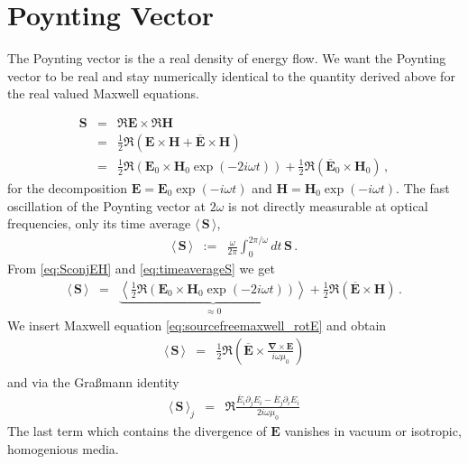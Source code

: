 \documentclass[12pt,a4paper,twoside,openright,BCOR10mm,headsepline,titlepage,abstracton,chapterprefix,final]{scrreprt}
\newcommand\Vector[1]{{\mathbf{#1}}}
\newcommand\vacuum{0}
\newcommand\Nabla{\Vector{\nabla}}
\newcommand\scalarEfield{E}
\newcommand\scalarHfield{H}
\newcommand\Efield{\Vector{\scalarEfield}}
\newcommand\Hfield{\Vector{\scalarHfield}}
\newcommand\vacuumpermeability{\mu_{\vacuum}}
\newcommand{\timeavg}[1]{{\langle\,#1\,\rangle}}
\begin{document}
\section{Poynting Vector}
The Poynting vector is the a real density of energy flow. 
We want the Poynting vector to be real and stay numerically identical to the quantity derived above for the real valued Maxwell equations.

\begin{eqnarray}
 \Vector{S} &=& \Re \Efield \times \Re \Hfield \nonumber \\
            &=& \frac{1}{2} \Re ( \Efield \times \Hfield + \overline{\Efield} \times \Hfield ) \nonumber \\
            &=& \frac{1}{2} \Re ( \Efield_0 \times \Hfield_0 \exp(-2i\omega t) )
	      + \frac{1}{2} \Re ( \overline{\Efield}_0 \times \Hfield_0 ) \label{eq:SconjEH}\,,
\end{eqnarray}
for the decomposition $\Efield = \Efield_0 \exp(-i\omega t)$ and $\Hfield = \Hfield_0 \exp(-i\omega t)$.
The fast oscillation of the Poynting vector at $2 \omega$ is not directly measurable at optical frequencies, only its time average $\timeavg{\Vector{S}}$,
\begin{eqnarray}
 \timeavg{\Vector{S}}  &:=& \frac{\omega}{2\pi} \int_{0}^{2\pi / \omega} dt \, \Vector{S} \label{eq:timeaverageS}\,.
\end{eqnarray}
From \eqref{eq:SconjEH} and \eqref{eq:timeaverageS} we get
\begin{eqnarray}
  \timeavg{\Vector{S}}   &=& \underbrace{\left\langle \frac{1}{2} \Re ( \Efield_0 \times \Hfield_0 \exp(-2i\omega t) )\right\rangle}_{\approx0} + \frac{1}{2} \Re ( \overline{\Efield} \times \Hfield )\,.
\end{eqnarray}
We insert Maxwell equation \eqref{eq:sourcefreemaxwell_rotE} and obtain
\begin{eqnarray}
 \timeavg{\Vector{S}}   &=& \frac{1}{2} \Re \left( \overline{\Efield} \times \frac{\Nabla \times \Efield}{i \omega \vacuumpermeability} \right) \\
\end{eqnarray}
and via the Gra\ss mann identity 
\begin{eqnarray}
  \timeavg{\Vector{S}}_j &=&  \Re \frac{ \overline{\scalarEfield}_i \partial_j \scalarEfield_i - \overline{\scalarEfield}_j \partial_i \scalarEfield_i }{2 i \omega \vacuumpermeability}
\end{eqnarray}
The last term which contains the divergence of $\Efield$ vanishes in vacuum or isotropic, homogenious media.
\end{document}
